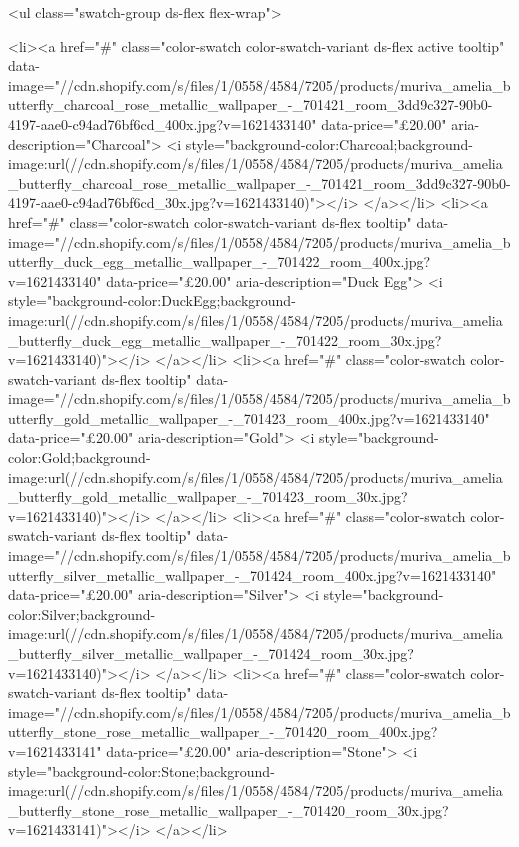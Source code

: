 {{{{{{{<ul class="swatch-group ds-flex flex-wrap">
        
<li><a href="#" class="color-swatch color-swatch-variant ds-flex active tooltip" data-image="//cdn.shopify.com/s/files/1/0558/4584/7205/products/muriva_amelia_butterfly_charcoal_rose_metallic_wallpaper_-_701421_room_3dd9c327-90b0-4197-aae0-c94ad76bf6cd_400x.jpg?v=1621433140" data-price="£20.00" aria-description="Charcoal">
              <i style="background-color:Charcoal;background-image:url(//cdn.shopify.com/s/files/1/0558/4584/7205/products/muriva_amelia_butterfly_charcoal_rose_metallic_wallpaper_-_701421_room_3dd9c327-90b0-4197-aae0-c94ad76bf6cd_30x.jpg?v=1621433140)"></i>
            </a></li>
<li><a href="#" class="color-swatch color-swatch-variant ds-flex tooltip" data-image="//cdn.shopify.com/s/files/1/0558/4584/7205/products/muriva_amelia_butterfly_duck_egg_metallic_wallpaper_-_701422_room_400x.jpg?v=1621433140" data-price="£20.00" aria-description="Duck Egg">
              <i style="background-color:DuckEgg;background-image:url(//cdn.shopify.com/s/files/1/0558/4584/7205/products/muriva_amelia_butterfly_duck_egg_metallic_wallpaper_-_701422_room_30x.jpg?v=1621433140)"></i>
            </a></li>
<li><a href="#" class="color-swatch color-swatch-variant ds-flex tooltip" data-image="//cdn.shopify.com/s/files/1/0558/4584/7205/products/muriva_amelia_butterfly_gold_metallic_wallpaper_-_701423_room_400x.jpg?v=1621433140" data-price="£20.00" aria-description="Gold">
              <i style="background-color:Gold;background-image:url(//cdn.shopify.com/s/files/1/0558/4584/7205/products/muriva_amelia_butterfly_gold_metallic_wallpaper_-_701423_room_30x.jpg?v=1621433140)"></i>
            </a></li>
<li><a href="#" class="color-swatch color-swatch-variant ds-flex tooltip" data-image="//cdn.shopify.com/s/files/1/0558/4584/7205/products/muriva_amelia_butterfly_silver_metallic_wallpaper_-_701424_room_400x.jpg?v=1621433140" data-price="£20.00" aria-description="Silver">
              <i style="background-color:Silver;background-image:url(//cdn.shopify.com/s/files/1/0558/4584/7205/products/muriva_amelia_butterfly_silver_metallic_wallpaper_-_701424_room_30x.jpg?v=1621433140)"></i>
            </a></li>
<li><a href="#" class="color-swatch color-swatch-variant ds-flex tooltip" data-image="//cdn.shopify.com/s/files/1/0558/4584/7205/products/muriva_amelia_butterfly_stone_rose_metallic_wallpaper_-_701420_room_400x.jpg?v=1621433141" data-price="£20.00" aria-description="Stone">
              <i style="background-color:Stone;background-image:url(//cdn.shopify.com/s/files/1/0558/4584/7205/products/muriva_amelia_butterfly_stone_rose_metallic_wallpaper_-_701420_room_30x.jpg?v=1621433141)"></i>
            </a></li>

}}}}}}}

